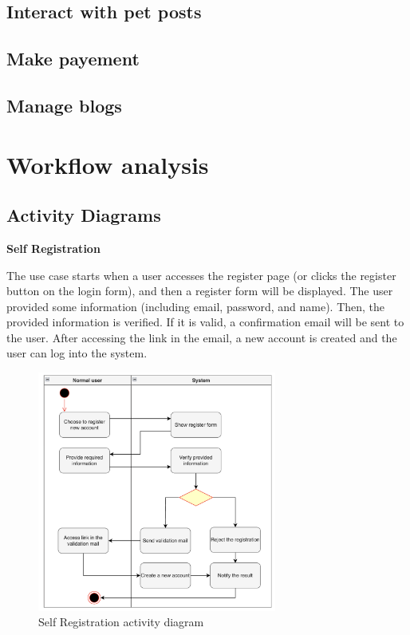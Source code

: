 \subsection{Interact with pet posts}
\subsection{Make payement}
\subsection{Manage blogs}

\section{Workflow analysis}
\subsection{Activity Diagrams}

\textbf{Self Registration}

The use case starts when a user accesses the register page (or clicks the register button on the login form), and then a register form will be displayed. The user provided some information (including email, password, and name). Then,  the provided information is verified. If it is valid, a confirmation email will be sent to the user. After accessing the link in the email, a new account is created and the user can log into the system.

\begin{figure}[H]
  \centering
  \includegraphics[width=0.7\textwidth]{Figures/self_register.png}
  \caption{Self Registration activity diagram}
  \label{fig:self-registration}
\end{figure}


